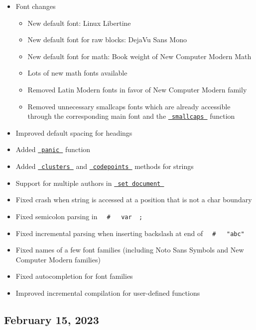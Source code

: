 \begin{itemize}
\tightlist
\item
  Font changes

  \begin{itemize}
  \tightlist
  \item
    New default font: Linux Libertine
  \item
    New default font for raw blocks: DejaVu Sans Mono
  \item
    New default font for math: Book weight of New Computer Modern Math
  \item
    Lots of new math fonts available
  \item
    Removed Latin Modern fonts in favor of New Computer Modern family
  \item
    Removed unnecessary smallcaps fonts which are already accessible
    through the corresponding main font and the
    \href{/docs/reference/text/smallcaps/}{\texttt{\ smallcaps\ }}
    function
  \end{itemize}
\item
  Improved default spacing for headings
\item
  Added \href{/docs/reference/foundations/panic/}{\texttt{\ panic\ }}
  function
\item
  Added
  \href{/docs/reference/foundations/str/\#definitions-clusters}{\texttt{\ clusters\ }}
  and
  \href{/docs/reference/foundations/str/\#definitions-codepoints}{\texttt{\ codepoints\ }}
  methods for strings
\item
  Support for multiple authors in
  \href{/docs/reference/model/document/\#parameters-author}{\texttt{\ set\ document\ }}
\item
  Fixed crash when string is accessed at a position that is not a char
  boundary
\item
  Fixed semicolon parsing in
  \texttt{\ }{\texttt{\ \#\ }}\texttt{\ }{\texttt{\ var\ }}\texttt{\ ;\ }
\item
  Fixed incremental parsing when inserting backslash at end of
  \texttt{\ }{\texttt{\ \#\ }}\texttt{\ }{\texttt{\ "abc"\ }}\texttt{\ }
\item
  Fixed names of a few font families (including Noto Sans Symbols and
  New Computer Modern families)
\item
  Fixed autocompletion for font families
\item
  Improved incremental compilation for user-defined functions
\end{itemize}

\subsection{February 15, 2023}\label{february-15-2023}

